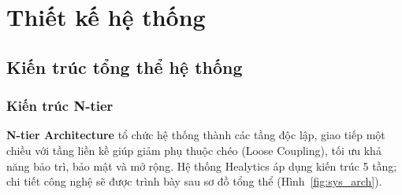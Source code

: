 \chapter{Thiết kế hệ thống}
\section{Kiến trúc tổng thể hệ thống}
\subsection{Kiến trúc N-tier}
\textbf{N-tier Architecture} tổ chức hệ thống thành các tầng độc lập, giao tiếp một chiều với tầng liền kề giúp giảm phụ thuộc chéo (Loose Coupling), tối ưu khả năng bảo trì, bảo mật và mở rộng. Hệ thống Healytics áp dụng kiến trúc 5 tầng; chi tiết công nghệ sẽ được trình bày sau sơ đồ tổng thể (Hình~\ref{fig:sys_arch}).
